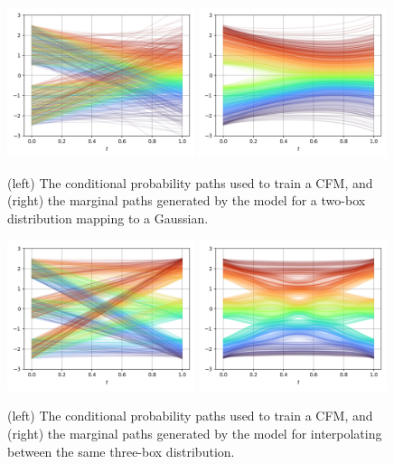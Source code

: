 \begin{figure}[ht]
    \centering
    \includegraphics[width=0.49\textwidth]{Figures/transformers/oned_target.png}
    \includegraphics[width=0.49\textwidth]{Figures/transformers/oned.png}
    \caption{(left) The conditional probability paths used to train a CFM, and (right) the marginal paths generated by the model for a two-box distribution mapping to a Gaussian.
    }
    \label{fig:squares_gaussian}
\end{figure}

\begin{figure}[ht]
    \centering
    \includegraphics[width=0.49\textwidth]{Figures/transformers/oned2.png}
    \includegraphics[width=0.49\textwidth]{Figures/transformers/oned2_marginal.png}
    \caption{(left) The conditional probability paths used to train a CFM, and (right) the marginal paths generated by the model for interpolating between the same three-box distribution.
    }
    \label{fig:squares_gaussian}
\end{figure}

